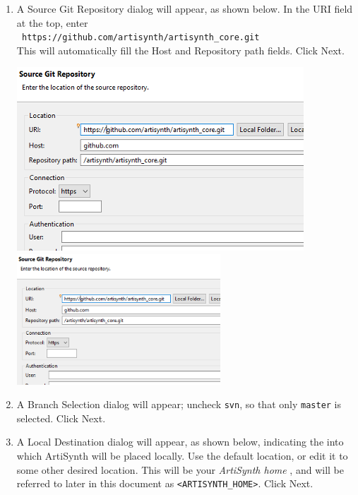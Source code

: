 \begin{enumerate}
\item A {\sf Source Git Repository} dialog will appear, as shown
below. In the {\sf URI} field at the top, enter\\{\tt
https://github.com/artisynth/artisynth\_core.git}\\This will
automatically fill the {\sf Host} and {\sf Repository path} fields.
Click {\sf Next}.

\begin{center}
\iflatexml
   \includegraphics[]{images/EclipseGitRepoDialog}
\else
   \includegraphics[width=0.6\textwidth]{images/EclipseGitRepoDialog}
\fi
\end{center}

\item A {\sf Branch Selection} dialog will appear; uncheck {\tt svn}, so
that only {\tt master} is selected. Click {\sf Next}. 

\item A {\sf Local Destination} dialog will appear, as shown below,
indicating the \directory{}into which ArtiSynth will be placed locally. Use
the default location, or edit it to some other desired location.  This
will be your {\it ArtiSynth home} \directory{}, and will be referred to
later in this document as {\tt <ARTISYNTH\_HOME>}. Click {\sf
Next}.


\end{enumerate}
